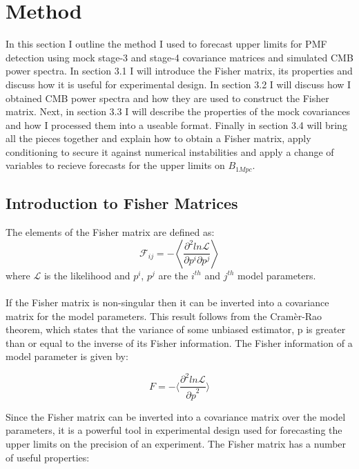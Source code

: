 \section{Method}

In this section I outline the method I used to forecast upper limits for PMF detection using mock stage-3 and stage-4 covariance matrices and simulated CMB power spectra. In section 3.1 I will introduce the Fisher matrix, its properties and discuss how it is useful for experimental design. In section 3.2 I will discuss how I obtained CMB power spectra and how they are used to construct the Fisher matrix. Next, in section 3.3 I will describe the properties of the mock covariances and how I processed them into a useable format. Finally in section 3.4 will bring all the pieces together and explain how to obtain a Fisher matrix, apply conditioning to secure it against numerical instabilities and apply a change of variables to recieve forecasts for the upper limits on $B_{1Mpc}$.

\subsection{Introduction to Fisher Matrices}
The elements of the Fisher matrix are defined as:
\begin{equation}
\mathcal{F}_{ij} = - \left \langle \frac{\partial^{2}ln{\mathcal{L}}}{\partial p^i\partial p^j } \right \rangle
\end{equation}
where $\mathcal{L}$ is the likelihood and $p^{i}$, $p^{j}$ are the $i^{th}$ and $j^{th}$ model parameters.
\\\\
If the Fisher matrix is non-singular then it can be inverted into a covariance matrix for the model parameters. This result follows from the Cram\`{e}r-Rao theorem, which states that the variance of some unbiased estimator, p is greater than or equal to the inverse of its Fisher information. The Fisher information of a model parameter is given by:

\begin{equation}
F = - \langle \frac{\partial^{2}ln{\mathcal{L}}}{{\partial p}^2} \rangle
\end{equation}

Since the Fisher matrix can be inverted into a covariance matrix over the model parameters, it is a powerful tool in experimental design used for forecasting the upper limits on the precision of an experiment. The Fisher matrix has a number of useful properties:


